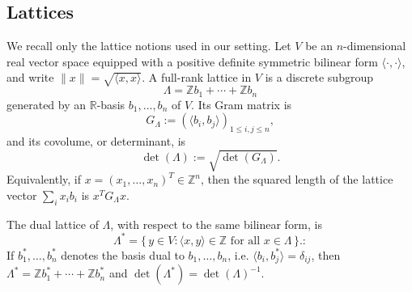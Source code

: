 

\subsection{Lattices}
\label{subsec:lattice}

We recall only the lattice notions used in our setting.  Let \(V\) be an
\(n\)-dimensional real vector space equipped with a positive definite
symmetric bilinear form \(\langle \cdot,\cdot\rangle\), and write
\(\|x\|=\sqrt{\langle x,x\rangle}\).  A full-rank lattice in \(V\) is a
discrete subgroup
\[
    \Lambda=\mathbb Z b_1+\cdots+\mathbb Z b_n
\]
generated by an \(\mathbb R\)-basis \(b_1,\ldots,b_n\) of \(V\).  Its Gram
matrix is
\[
    G_\Lambda:=(\langle b_i,b_j\rangle)_{1\le i,j\le n},
\]
and its covolume, or determinant, is
\[
    \det(\Lambda):=\sqrt{\det(G_\Lambda)}.
\]
Equivalently, if \(x=(x_1,\ldots,x_n)^T\in \mathbb Z^n\), then the squared
length of the lattice vector \(\sum_i x_i b_i\) is \(x^TG_\Lambda x\).

The dual lattice of \(\Lambda\), with respect to the same bilinear form, is
\[
    \Lambda^\ast
    =
    \{\, y\in V : \langle x,y\rangle\in \mathbb Z
        \text{ for all } x\in \Lambda \,\}.
:\]
If \(b_1^\ast,\ldots,b_n^\ast\) denotes the basis dual to
\(b_1,\ldots,b_n\), i.e. \(\langle b_i,b_j^\ast\rangle=\delta_{ij}\), then
\(\Lambda^\ast=\mathbb Z b_1^\ast+\cdots+\mathbb Z b_n^\ast\) and
\(\det(\Lambda^\ast)=\det(\Lambda)^{-1}\).

